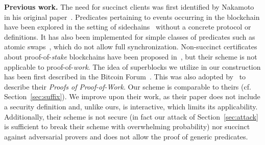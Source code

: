 \noindent
\textbf{Previous work.} The need for succinct clients was first identified by
Nakamoto in his original paper~\cite{bitcoin}. Predicates pertaining to events
occurring in the blockchain have been explored in the setting of
sidechains~\cite{sidechains} without a concrete protocol or definitions. It has
also been implemented for simple classes of predicates such as atomic
swaps~\cite{tiernolan,herlihy2018atomic}, which do not allow full
synchronization. Non-succinct certificates about proof-of-\emph{stake}
blockchains have been proposed in~\cite{gazi2019proof}, but their scheme is not
applicable to proof-of-\emph{work}. The idea of superblocks we utilize in our
construction has been first described in the Bitcoin Forum~\cite{highway}. This
was also adopted by~\cite{KLS} to describe their \emph{Proofs of Proof-of-Work}.
Our scheme is comparable to theirs (cf. Section~\ref{sec:suffix}). We improve
upon their work, as their paper does not include a security definition and,
unlike ours, is interactive, which limits its applicability. Additionally, their
scheme is not secure (in fact our attack of Section~\ref{sec:attack} is
sufficient to break their scheme with overwhelming probability) nor succinct
against adversarial provers and does not allow the proof of generic predicates.
